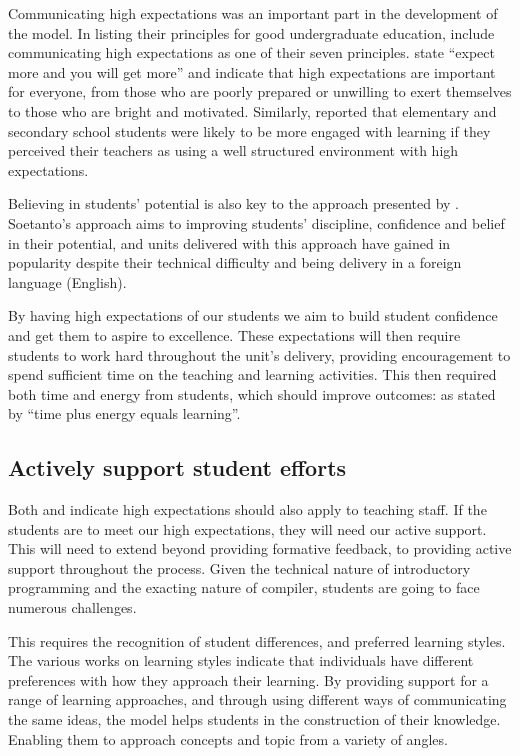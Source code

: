 Communicating high expectations was an important part in the development of the model. In listing their principles for good undergraduate education, \citet{Chickering:1987} include communicating high expectations as one of their seven principles. \citet{Chickering:1987} state ``expect more and you will get more'' and indicate that high expectations are important for everyone, from those who are poorly prepared or unwilling to exert themselves to those who are bright and motivated. Similarly, \citet{Klem:2004} reported that elementary and secondary school students were likely to be more engaged with learning if they perceived their teachers as using a well structured environment with high expectations. 

Believing in students' potential is also key to the approach presented by \citet{Soetanto:2003,Soetanto:2012}. Soetanto's approach aims to improving students' discipline, confidence and belief in their potential, and units delivered with this approach have gained in popularity despite their technical difficulty and being delivery in a foreign language (English). 

By having high expectations of our students we aim to build student confidence and get them to aspire to excellence. These expectations will then require students to work hard throughout the unit's delivery, providing encouragement to spend sufficient time on the teaching and learning activities. This then required both time and energy from students, which should improve outcomes: as stated by \citet{Chickering:1987} ``time plus energy equals learning''.


\subsection{Actively support student efforts} %
\label{ssub:actively_support_student_efforts}

Both \citet{Chickering:1987} and \citet{Soetanto:2003,Soetanto:2012} indicate high expectations should also apply to teaching staff. If the students are to meet our high expectations, they will need our active support. This will need to extend beyond providing formative feedback, to providing active support throughout the process. Given the technical nature of introductory programming and the exacting nature of compiler, students are going to face numerous challenges.

This requires the recognition of student differences, and preferred learning styles. The various works on learning styles \cite{Coffield:2004} indicate that individuals have different preferences with how they approach their learning. By providing support for a range of learning approaches, and through using different ways of communicating the same ideas, the model helps students in the construction of their knowledge. Enabling them to approach concepts and topic from a variety of angles.

